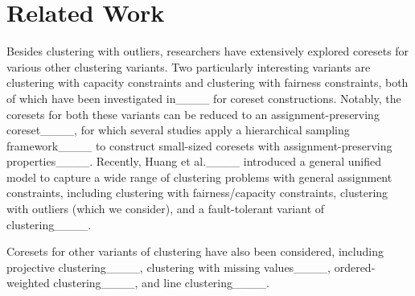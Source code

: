 \section{Related Work}
\label{sec:related}
Besides clustering with outliers, researchers have extensively explored coresets for various other clustering variants. 
Two particularly interesting variants are clustering with capacity constraints
and clustering with fairness constraints, both of which have been investigated in____ for coreset constructions.
Notably, the coresets for both these variants can be reduced to an assignment-preserving coreset____, for which several studies apply a hierarchical sampling framework____ to construct small-sized coresets with assignment-preserving properties____. Recently, Huang et al.____ introduced a general unified model to capture a wide range of clustering problems with general assignment constraints, including clustering with fairness/capacity constraints, clustering with outliers (which we consider), and a fault-tolerant variant of clustering____.


Coresets for other variants of clustering have also been considered, including projective clustering____, clustering with missing values____, ordered-weighted clustering____, and line clustering____.